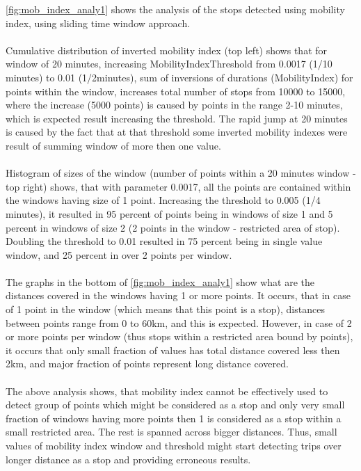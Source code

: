 \autoref{fig:mob_index_analy1} shows the analysis of the stops detected using mobility index, using sliding time window approach.
\\\\
Cumulative distribution of inverted mobility index (top left) shows that for window of 20 minutes, increasing MobilityIndexThreshold from 0.0017 (1/10 minutes) to 0.01 (1/2minutes), sum of inversions of durations (MobilityIndex) for points within the window, increases total number of stops from 10000 to 15000, where the increase (5000 points) is caused by points in the range 2-10 minutes, which is expected result increasing the threshold. The rapid jump at 20 minutes is caused by the fact that at that threshold some inverted mobility indexes were result of summing window of more then one value. 
\\\\
Histogram of sizes of the window (number of points within a 20 minutes window - top right) shows, that with parameter 0.0017, all the points are contained within the windows having size of 1 point. Increasing the threshold to 0.005 (1/4 minutes), it resulted in 95 percent of points being in windows of size 1 and 5 percent in windows of size 2 (2 points in the window - restricted area of stop). Doubling the threshold to 0.01 resulted in 75 percent being in single value window, and 25 percent in over 2 points per window. 
\\\\
The graphs in the bottom of \autoref{fig:mob_index_analy1} show what are the distances covered in the windows having 1 or more points. It occurs, that in case of 1 point in the window (which means that this point is a stop), distances between points range from 0 to 60km, and this is expected. However, in case of 2 or more points per window (thus stops within a restricted area bound by points), it occurs that only small fraction of values has total distance covered less then 2km, and major fraction of points represent long distance covered. 
\\\\
The above analysis shows, that mobility index cannot be effectively used to detect group of points which might be considered as a stop and only very small fraction of windows having more points then 1 is considered as a stop within a small restricted area. The rest is spanned across bigger distances. Thus, small values of mobility index window and threshold might start detecting trips over longer distance as a stop and providing erroneous results. 
  
